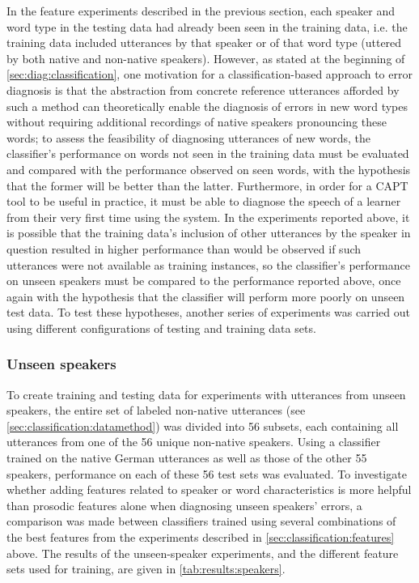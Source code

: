 	
	In the feature experiments described in the previous section, each speaker and word type in the testing data had already been seen in the training data, i.e. the training data included utterances by that speaker or of that word type (uttered by both native and non-native speakers). However, as stated at the beginning of \cref{sec:diag:classification}, one motivation for a classification-based approach to error diagnosis is that the abstraction from concrete reference utterances afforded by such a method can theoretically enable the diagnosis of errors in new word types without requiring additional recordings of native speakers pronouncing these words; to assess the feasibility of diagnosing utterances of new words, the classifier's performance on words not seen in the training data must be evaluated and compared with the performance observed on seen words, with the hypothesis that the former will be better than the latter. Furthermore, in order for a CAPT tool to be useful in practice, it must be able to diagnose the speech of a learner from their very first time using the system. In the experiments reported above, it is possible that the training data's inclusion of other utterances by the speaker in question resulted in higher performance than would be observed if such utterances were not available as training instances, so the classifier's performance on unseen speakers must be compared to the performance reported above, once again with the hypothesis that the classifier will perform more poorly on unseen test data. To test these hypotheses, another series of experiments was carried out using different configurations of testing and training data sets. 
	
	
	\subsubsection{Unseen speakers}	
	
	To create training and testing data for experiments with utterances from unseen speakers, the entire set of labeled non-native utterances (see \cref{sec:classification:datamethod}) was divided into 56 subsets, each containing all utterances from one of the 56 unique non-native speakers. Using a classifier trained on the native German utterances as well as those of the other 55 speakers, performance on each of these 56 test sets was evaluated. To investigate whether adding features related to speaker or word characteristics is more helpful than prosodic features alone when diagnosing unseen speakers' errors, a comparison was made between classifiers trained using several combinations of the best features from the experiments described in \cref{sec:classification:features} above. The results of the unseen-speaker experiments, and the different feature sets used for training, are given in \cref{tab:results:speakers}.
		
